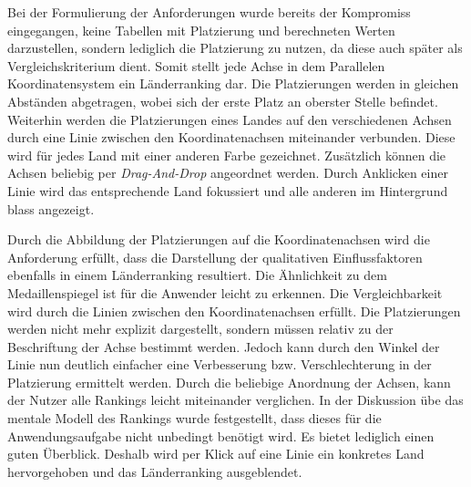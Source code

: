 Bei der Formulierung der Anforderungen wurde bereits der Kompromiss eingegangen, keine Tabellen mit Platzierung und berechneten Werten darzustellen, sondern lediglich die Platzierung zu nutzen, da diese auch später als Vergleichskriterium dient. Somit stellt jede Achse in dem Parallelen Koordinatensystem ein Länderranking dar. Die Platzierungen werden in gleichen Abständen abgetragen, wobei sich der erste Platz an oberster Stelle befindet. Weiterhin werden die Platzierungen eines Landes auf den verschiedenen Achsen durch eine Linie zwischen den Koordinatenachsen miteinander verbunden. Diese wird für jedes Land mit einer anderen Farbe gezeichnet. Zusätzlich können die Achsen beliebig per \textit{Drag-And-Drop} angeordnet werden. Durch Anklicken einer Linie wird das entsprechende Land fokussiert und alle anderen im Hintergrund blass angezeigt.

Durch die Abbildung der Platzierungen auf die Koordinatenachsen wird die Anforderung erfüllt, dass die Darstellung der qualitativen Einflussfaktoren ebenfalls in einem Länderranking resultiert. Die Ähnlichkeit zu dem Medaillenspiegel ist für die Anwender leicht zu erkennen. Die Vergleichbarkeit wird durch die Linien zwischen den Koordinatenachsen erfüllt. Die Platzierungen werden nicht mehr explizit dargestellt, sondern müssen relativ zu der Beschriftung der Achse bestimmt werden. Jedoch kann durch den Winkel der Linie nun deutlich einfacher eine Verbesserung bzw. Verschlechterung in der Platzierung ermittelt werden. Durch die beliebige Anordnung der Achsen, kann der Nutzer alle Rankings leicht miteinander verglichen. In der Diskussion übe das mentale Modell des Rankings wurde festgestellt, dass dieses für die Anwendungsaufgabe nicht unbedingt benötigt wird. Es bietet lediglich einen guten Überblick. Deshalb wird per Klick auf eine Linie ein konkretes Land hervorgehoben und das Länderranking ausgeblendet.


